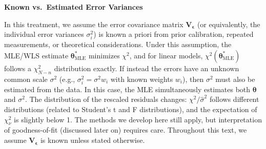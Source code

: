 \begin{warningBox}
    \textbf{Known vs.\ Estimated Error Variances}

    In this treatment, we assume the error covariance matrix $\mathbf{V}_{\boldsymbol{\epsilon}}$ (or equivalently, the individual error variances $\sigma_i^2$) is known a priori from prior calibration, repeated measurements, or theoretical considerations. Under this assumption, the MLE/WLS estimate $\boldsymbol{\theta}^*_{\text{MLE}}$ minimizes $\chi^2$, and for linear models, $\chi^2(\boldsymbol{\theta}^*_{\text{MLE}})$ follows a $\chi^2_{N-n}$ distribution exactly. If instead the errors have an unknown common scale $\sigma^2$ (e.g., $\sigma_i^2 = \sigma^2 w_i$ with known weights $w_i$), then $\sigma^2$ must also be estimated from the data. In this case, the MLE simultaneously estimates both $\boldsymbol{\theta}$ and $\sigma^2$. The distribution of the rescaled residuals changes: $\chi^2/\hat{\sigma}^2$ follows different distributions (related to Student's t and F distributions), and the expectation of $\chi^2_\nu$ is slightly below 1. The methods we develop here still apply, but interpretation of goodness-of-fit (discussed later on) requires care. Throughout this text, we assume $\mathbf{V}_{\boldsymbol{\epsilon}}$ is known unless stated otherwise.
\end{warningBox}

